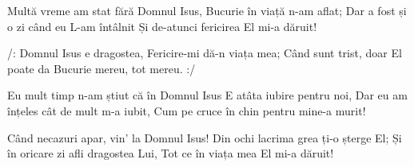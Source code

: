 \beginverse
Multă vreme am stat fără Domnul Isus,
Bucurie în viață n-am aflat;
Dar a fost și o zi când eu L-am întâlnit
Și de-atunci fericirea El mi-a dăruit!
\endverse

\beginchorus
/: Domnul Isus e dragostea,
Fericire-mi dă-n viața mea;
Când sunt trist, doar El poate da
Bucurie mereu, tot mereu. :/
\endchorus

\beginverse
Eu mult timp n-am știut că în Domnul Isus
E atâta iubire pentru noi,
Dar eu am înțeles cât de mult m-a iubit,
Cum pe cruce în chin pentru mine-a murit!
\endverse

\beginverse
Când necazuri apar, vin' la Domnul Isus!
Din ochi lacrima grea ți-o șterge El;
Și în oricare zi afli dragostea Lui,
Tot ce în viața mea El mi-a dăruit!
\endverse
\endsong